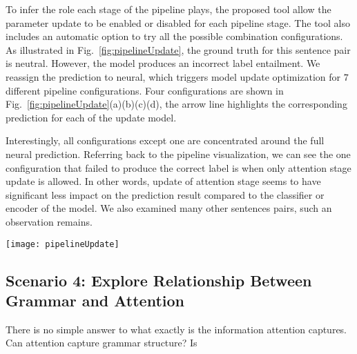 To infer the role each stage of the pipeline plays, the proposed tool allow the parameter update to be enabled or disabled for each pipeline stage.
The tool also includes an automatic option to try all the possible combination configurations. As illustrated in Fig.~\ref{fig:pipelineUpdate}, the ground truth for this sentence pair is neutral. However, the model produces an incorrect label entailment. We reassign the prediction to neural, which triggers model update optimization for $7$ different pipeline configurations. Four configurations are shown in Fig.~\ref{fig:pipelineUpdate}(a)(b)(c)(d), the arrow line highlights the corresponding prediction for each of the update model.

Interestingly, all configurations except one are concentrated around the full neural prediction. Referring back to the pipeline visualization, we can see the one configuration that failed to produce the correct label is when only attention stage update is allowed.
%
In other words, update of attention stage seems to have significant less impact on the prediction result compared to the classifier or encoder of the model.
We also examined many other sentences pairs, such an observation remains.

%



\begin{figure*}[t]
\centering
\vspace{-2mm}
 \texttt{[image: pipelineUpdate]}
 \caption{
How changes in different stage impact the prediction.
 }
\label{fig:pipelineUpdate}
\end{figure*}

\subsection{Scenario 4: Explore Relationship Between Grammar and Attention}
There is no simple answer to what exactly is the information attention captures.
Can attention capture grammar structure? Is

